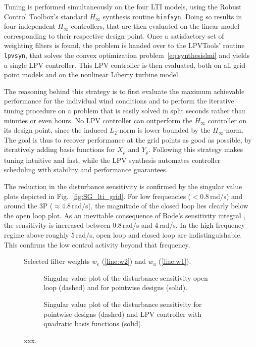 \documentclass[times]{weauth}
\begin{document}
Tuning is performed simultaneously on the four LTI models, using the Robust Control Toolbox's standard $H_\infty$ synthesis routine \texttt{hinfsyn}. Doing so results in four independent $H_\infty$ controllers, that are then evaluated on the linear model corresponding to their respective design point. Once a satisfactory set of weighting filters is found, the problem is handed over to the LPVTools' routine \texttt{lpvsyn}, that solves the convex optimization problem~\eqref{eq:synthesislmi} and yields a single LPV controller. This LPV controller is then evaluated, both on all grid-point models and on the nonlinear Liberty turbine model. 

The reasoning behind this strategy is to first evaluate the maximum achievable performance for the individual wind conditions and to perform the iterative tuning procedure on a problem that is easily solved in split seconds rather than minutes or even hours. No LPV controller can outperform the $H_\infty$ controller on its design point, since the induced $L_2$-norm is lower bounded by the $H_\infty$-norm. The goal is thus to recover performance at the grid points as good as possible, by iteratively adding basis functions for $X_\rho$ and $Y_\rho$. Following this strategy makes tuning intuitive and fast, while the LPV synthesis automates controller scheduling with stability and performance guarantees. 

The reduction in the disturbance sensitivity is confirmed by the singular value
plots depicted in Fig.~\ref{fig:SG_lti_grid}.
For low frequencies  ($<$0.8$\,$rad$/$s) and around the 3P  ($\approx$4.8$\,$rad$/$s), the magnitude of the closed loop lies clearly below the open loop plot. 
As an inevitable consequence of Bode's sensitivity integral \cite{Skoge_05,stein03}, the sensitivity is increased between 0.8\,rad/s and 4\,rad/s. 
In the high frequency regime above roughly 5\,rad/s, open loop and closed loop are indistinguishable. This confirms the low control activity beyond that frequency.
 
\begin{figure}[t] 
	\centering
		
	\caption{Selected filter weights $w_e$ (\ref{line:w2}) and $w_u$
	(\ref{line:w1}).} 
	\label{fig:weights}	
\end{figure}  
  
 
\begin{figure}[t]
\begin{subfigure}{0.45\linewidth} 
\centering
		 
\caption{Singular value plot of the disturbance sensitivity  open loop (dashed) and for pointwise designs (solid).}
\end{subfigure}
\hfill
\begin{subfigure}{0.45\linewidth}
\centering
		
\caption{Singular value plot of the disturbance sensitivity for pointwise designs (dashed) and LPV controller with quadratic basis functions (solid).}
\end{subfigure}
\caption{xxx.}
\end{figure} 
 
\end{document}
